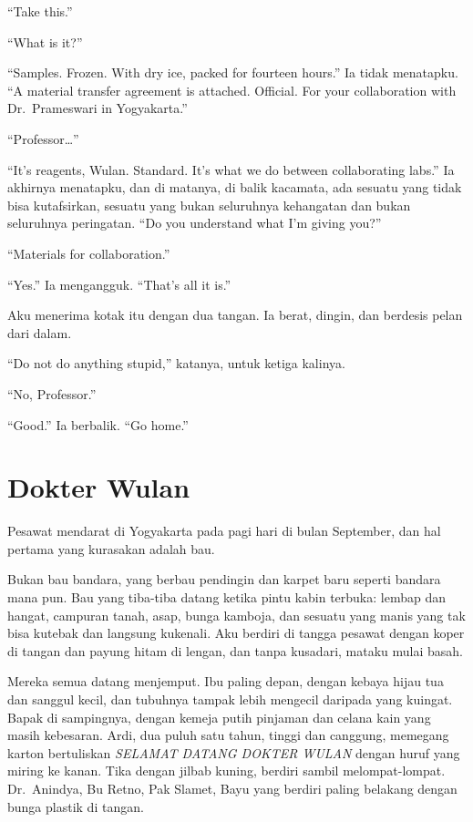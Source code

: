 \documentclass[11pt,twoside,openany]{book}
\begin{document}
``Take this.''

``What is it?''

``Samples. Frozen. With dry ice, packed for fourteen hours.'' Ia tidak menatapku. ``A material transfer agreement is attached. Official. For your collaboration with Dr.~Prameswari in Yogyakarta.''

``Professor\ldots{}''

``It's reagents, Wulan. Standard. It's what we do between collaborating labs.'' Ia akhirnya menatapku, dan di matanya, di balik kacamata, ada sesuatu yang tidak bisa kutafsirkan, sesuatu yang bukan seluruhnya kehangatan dan bukan seluruhnya peringatan. ``Do you understand what I'm giving you?''

``Materials for collaboration.''

``Yes.'' Ia mengangguk. ``That's all it is.''

Aku menerima kotak itu dengan dua tangan. Ia berat, dingin, dan berdesis pelan dari dalam.

``Do not do anything stupid,'' katanya, untuk ketiga kalinya.

``No, Professor.''

``Good.'' Ia berbalik. ``Go home.''

\chapter{Dokter Wulan}
Pesawat mendarat di Yogyakarta pada pagi hari di bulan September, dan hal pertama yang kurasakan adalah bau.

Bukan bau bandara, yang berbau pendingin dan karpet baru seperti bandara mana pun. Bau yang tiba-tiba datang ketika pintu kabin terbuka: lembap dan hangat, campuran tanah, asap, bunga kamboja, dan sesuatu yang manis yang tak bisa kutebak dan langsung kukenali. Aku berdiri di tangga pesawat dengan koper di tangan dan payung hitam di lengan, dan tanpa kusadari, mataku mulai basah.

Mereka semua datang menjemput. Ibu paling depan, dengan kebaya hijau tua dan sanggul kecil, dan tubuhnya tampak lebih mengecil daripada yang kuingat. Bapak di sampingnya, dengan kemeja putih pinjaman dan celana kain yang masih kebesaran. Ardi, dua puluh satu tahun, tinggi dan canggung, memegang karton bertuliskan \emph{SELAMAT DATANG DOKTER WULAN} dengan huruf yang miring ke kanan. Tika dengan jilbab kuning, berdiri sambil melompat-lompat. Dr.~Anindya, Bu Retno, Pak Slamet, Bayu yang berdiri paling belakang dengan bunga plastik di tangan.
\end{document}
